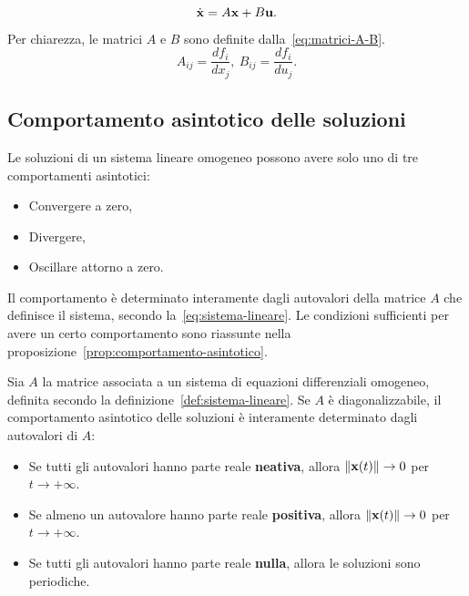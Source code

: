 \begin{equation}
    \dot {\mathbf{x}} = A\mathbf{x} + B\mathbf{u}.
    \label{eq:sistema-linearizzato}
\end{equation}
Per chiarezza, le matrici $A$ e $B$ sono definite dalla~\eqref{eq:matrici-A-B}.
\begin{equation}
    A_{ij} = \frac{df_i}{dx_j},\ B_{ij} = \frac{df_i}{du_j}.
    \label{eq:matrici-A-B}
\end{equation}

\subsection{Comportamento asintotico delle soluzioni}
Le soluzioni di un sistema lineare omogeneo possono avere solo uno di tre comportamenti asintotici:
\begin{itemize}
    \item Convergere a zero,
    \item Divergere,
    \item Oscillare attorno a zero.
\end{itemize}
Il comportamento è determinato interamente dagli autovalori della matrice $A$ che definisce il
sistema, secondo la~\eqref{eq:sistema-lineare}.
Le condizioni sufficienti per avere un certo comportamento sono riassunte nella proposizione~\ref{prop:comportamento-asintotico}.
\begin{prop}
    Sia $A$ la matrice associata a un sistema di equazioni differenziali omogeneo,
    definita secondo la definizione~\ref{def:sistema-lineare}.
    Se $A$ è diagonalizzabile, il comportamento asintotico delle soluzioni è interamente
    determinato dagli autovalori di $A$:
    \begin{itemize}
        \item Se tutti gli autovalori hanno parte reale \textbf{neativa}, allora $\lVert\mathbf{x}(t)\rVert \to 0$ per $t \to +\infty$.%
        \item Se almeno un autovalore hanno parte reale \textbf{positiva}, allora $\lVert\mathbf{x}(t)\rVert \to 0$ per $t \to +\infty$.%
        \item Se tutti gli autovalori hanno parte reale \textbf{nulla}, allora le soluzioni sono periodiche.
    \end{itemize}
    \label{prop:comportamento-asintotico}
\end{prop}

